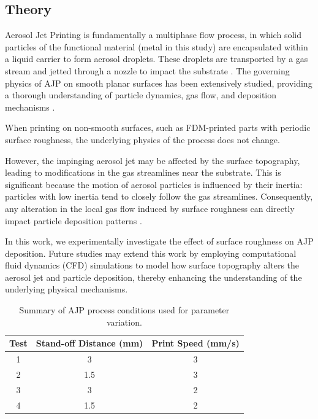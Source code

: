 \documentclass[subscriptcorrection,upint,varvw,balance,hyphenate]{asmejour}
\begin{document}
\subsection{Theory}

Aerosol Jet Printing is fundamentally a multiphase flow process, in which solid particles of the functional material (metal in this study) are encapsulated within a liquid carrier to form aerosol droplets. These droplets are transported by a gas stream and jetted through a nozzle to impact the substrate \cite{secor2018principles,salary2017computational}. The governing physics of AJP on smooth planar surfaces has been extensively studied, providing a thorough understanding of particle dynamics, gas flow, and deposition mechanisms \cite{chen2018effect,salary2017computational,ramesh2023computational}.


When printing on non-smooth surfaces, such as FDM-printed parts with periodic surface roughness, the underlying physics of the process does not change. 

However, the impinging aerosol jet may be affected by the surface topography, leading to modifications in the gas streamlines near the substrate. This is significant because the motion of aerosol particles is influenced by their inertia: particles with low inertia tend to closely follow the gas streamlines. Consequently, any alteration in the local gas flow induced by surface roughness can directly impact particle deposition patterns \cite{rurup2024understanding}.

In this work, we experimentally investigate the effect of surface roughness on AJP deposition. Future studies may extend this work by employing computational fluid dynamics (CFD) simulations to model how surface topography alters the aerosol jet and particle deposition, thereby enhancing the understanding of the underlying physical mechanisms.

\begin{table}[]
\centering %
\caption{Summary of AJP process conditions used for parameter variation.} %
\label{tab:1} %
\begin{tabular}{@{}ccc@{}} %
\toprule
\textbf{Test}      & \textbf{Stand-off Distance (mm)}                   & \textbf{Print Speed (mm/s)}             \\ \midrule
1    & 3              & 3 \\
2    & 1.5            & 3 \\
3    & 3              & 2 \\
4    & 1.5            & 2 \\ \bottomrule
\end{tabular}
\end{table}
\end{document}
